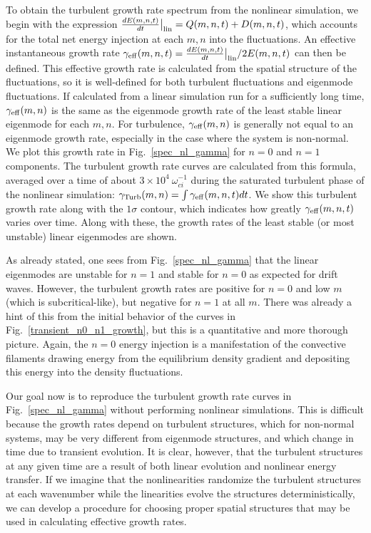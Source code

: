 \documentclass[showpacs,preprintnumbers,amsmath,amssymb,superscriptaddress,aip]{revtex4-1}
\newcommand{\diff}[2]{\frac{d#1}{d#2}}
\begin{document}
To obtain the turbulent growth rate spectrum from the nonlinear simulation, we begin with the expression $\diff{E(m,n,t)}{t}\big|_{\rm{lin}} = Q(m,n,t) + D(m,n,t)$, 
which accounts for the total net energy injection at each $m,n$ into the fluctuations. 
An effective instantaneous growth rate $\gamma_{\rm{eff}}(m,n,t) = \diff{E(m,n,t)}{t}\big|_{\rm{lin}}/ 2 E(m,n,t)$ can then be defined. 
This effective growth rate is calculated from the spatial structure of the fluctuations, so it is well-defined for both turbulent fluctuations and eigenmode fluctuations. If calculated
from a linear simulation run for a sufficiently long time, $\gamma_{\rm{eff}}(m,n)$ is the same as the eigenmode growth rate of the least stable linear eigenmode for each $m,n$.
For turbulence, $\gamma_{\rm{eff}}(m,n)$ is generally not equal to an eigenmode growth rate, especially in the case where the system is non-normal.
We plot this growth rate in Fig.~\ref{spec_nl_gamma} for $n=0$ and $n=1$ components. The turbulent growth rate curves are calculated from this formula, 
averaged over a time of about $3 \times 10^{4} \ \omega_{ci}^{-1}$ during the saturated turbulent phase of the nonlinear simulation: $\gamma_{\rm{Turb}}(m,n) = \int \gamma_{\rm{eff}}(m,n,t) dt$. 
We show this turbulent growth rate along with the $1 \sigma$ contour, which indicates how greatly $\gamma_{\rm{eff}}(m,n,t)$ varies over time.
Along with these, the growth rates of the least stable (or most unstable) linear eigenmodes are shown.

As already stated, one sees from Fig.~\ref{spec_nl_gamma} that the linear eigenmodes are unstable for $n=1$ and stable for $n=0$ as expected for drift waves. 
However, the turbulent growth rates are positive for $n=0$ and low $m$ (which is subcritical-like), but negative for $n=1$ at all $m$. 
There was already a hint of this from the initial behavior of the curves in Fig.~\ref{transient_n0_n1_growth}, but this is a quantitative and more thorough picture.
Again, the $n=0$ energy injection is a manifestation of the convective filaments drawing energy from the equilibrium density gradient and depositing this energy into the density fluctuations.

Our goal now is to reproduce the turbulent growth rate curves in Fig.~\ref{spec_nl_gamma} without performing nonlinear simulations. This is difficult because the growth rates depend on turbulent
structures, which for non-normal systems, may be very different from eigenmode structures, and which change in time due to transient evolution.
It is clear, however, that the turbulent structures at any given time are a result of both linear evolution and nonlinear energy transfer. 
If we imagine that the nonlinearities randomize the turbulent structures at each wavenumber while the linearities evolve the structures
deterministically, we can develop a procedure for choosing proper spatial structures that may be used in calculating effective growth rates.
\end{document}
